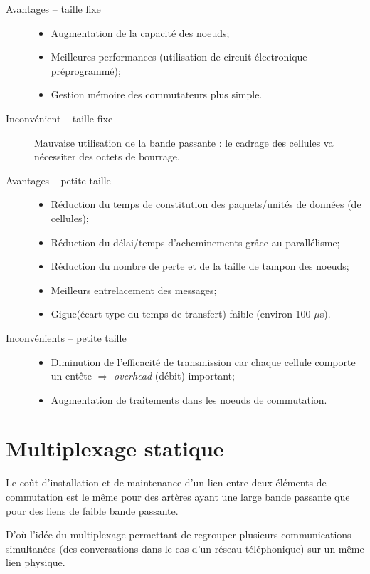 \documentclass[11pt,english,french]{scrreprt}
\theoremstyle{remark}
\theoremstyle{definition}
\begin{document}
\begin{description}
	\item [Avantages -- taille fixe]\hfill\begin{itemize}
		\item Augmentation de la capacité des noeuds;
		\item Meilleures performances (utilisation de circuit électronique préprogrammé);
		\item Gestion mémoire des commutateurs plus simple.
	\end{itemize}
	\item[Inconvénient -- taille fixe] Mauvaise utilisation de la bande passante : le cadrage des cellules va nécessiter des octets de bourrage.
	\item[Avantages -- petite taille] \hfill\begin{itemize}
		\item Réduction du temps de constitution des paquets/unités de données (de cellules);
		\item Réduction du délai/temps d'acheminements grâce au parallélisme;
		\item Réduction du nombre de perte et de la taille de tampon des noeuds;
		\item Meilleurs entrelacement des messages;
		\item Gigue(écart type du temps de transfert) faible (environ 100 $\mu$s).
	\end{itemize}
	\item[Inconvénients -- petite taille] \hfill\begin{itemize}
		\item Diminution de l'efficacité de transmission car chaque cellule comporte un entête $\Rightarrow$ \emph{overhead} (débit) important;
		\item Augmentation de traitements dans les noeuds de commutation.
	\end{itemize}
\end{description}

\clearpage

\section{Multiplexage statique} %

Le coût d'installation et de maintenance d'un lien entre deux éléments de commutation est le même pour des artères ayant une large bande passante que pour des liens de faible bande passante. 

D'où l'idée du multiplexage permettant de regrouper plusieurs communications simultanées (des conversations dans le cas d’un réseau téléphonique) sur un même lien physique.
\end{document}
